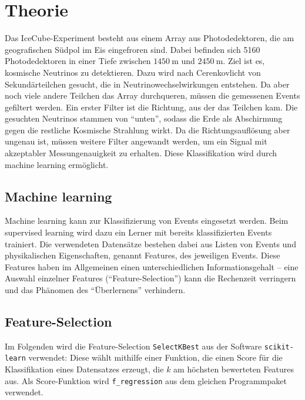 \section{Theorie}
\label{sec:Theorie}
Das IceCube-Experiment besteht aus einem Array aus Photodedektoren, die am geografischen Südpol im Eis eingefroren sind. Dabei befinden sich 5160 Photodedektoren in einer Tiefe zwischen $\SI{1450}{\meter}$ und $\SI{2450}{\meter}$. Ziel ist es, kosmische Neutrinos zu detektieren. Dazu wird nach Cerenkovlicht von Sekundärteilchen gesucht, die in Neutrinowechselwirkungen entstehen. Da aber noch viele andere Teilchen das Array durchqueren, müssen die gemessenen Events gefiltert werden. Ein erster Filter ist die Richtung, aus der das Teilchen kam. Die gesuchten Neutrinos stammen von \enquote{unten}, sodass die Erde als Abschirmung gegen die restliche Kosmische Strahlung wirkt. Da die Richtungsauflösung aber ungenau ist, müssen weitere Filter angewandt werden, um ein Signal mit akzeptabler Messungenauigkeit zu erhalten. Diese Klassifikation wird durch machine learning ermöglicht. 

\subsection{Machine learning}
Machine learning kann zur Klassifizierung von Events eingesetzt werden. Beim supervised learning wird dazu ein Lerner mit bereits klassifizierten Events trainiert. Die verwendeten Datensätze bestehen dabei aus Listen von Events und physikalischen Eigenschaften, genannt Features, des jeweiligen Events. Diese Features haben im Allgemeinen einen unterschiedlichen Informationsgehalt -- eine Auswahl einzelner Features (\enquote{Feature-Selection}) kann die Rechenzeit verringern und das Phänomen des \enquote{Überlernens} verhindern.

\subsection{Feature-Selection}
\label{fs}
Im Folgenden wird die Feature-Selection \texttt{SelectKBest} aus der Software \texttt{scikit-learn} \cite{scikit} verwendet: Diese wählt mithilfe einer Funktion, die einen Score für die Klassifikation eines Datensatzes erzeugt, die $k$ am höchsten bewerteten Features aus. Als Score-Funktion wird \texttt{f\_regression} aus dem gleichen Programmpaket verwendet.

%
%


